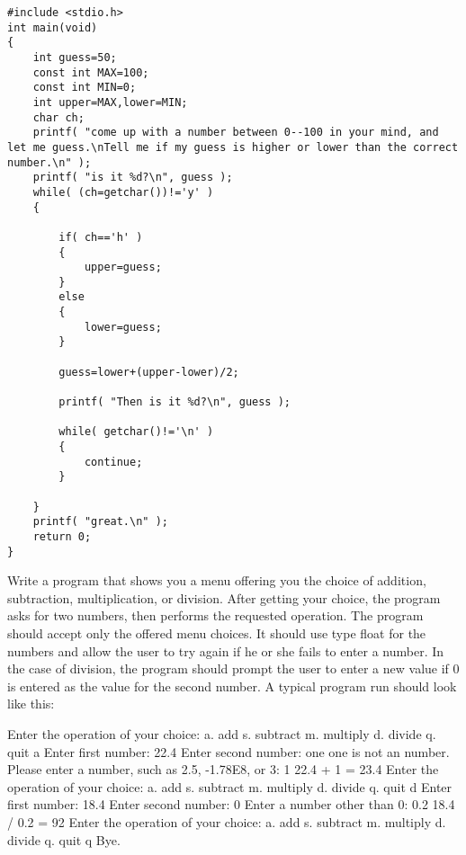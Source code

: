 \begin{solution}
  \begin{verbatim}
#include <stdio.h>
int main(void)
{
	int guess=50;
	const int MAX=100;
	const int MIN=0;
	int upper=MAX,lower=MIN;
	char ch;
	printf( "come up with a number between 0--100 in your mind, and let me guess.\nTell me if my guess is higher or lower than the correct number.\n" );
	printf( "is it %d?\n", guess );
	while( (ch=getchar())!='y' )
	{

		if( ch=='h' )
		{
			upper=guess;
		}
		else
		{
			lower=guess;
		}

		guess=lower+(upper-lower)/2;

		printf( "Then is it %d?\n", guess );

		while( getchar()!='\n' )
		{
			continue;
		}

	}
	printf( "great.\n" );
	return 0;
}
  \end{verbatim}
\end{solution}
\begin{question}
Write a program that shows you a menu offering you the choice of addition, subtraction,
multiplication, or division. After getting your choice, the program asks for two numbers,
then performs the requested operation. The program should accept only the offered
menu choices. It should use type float for the numbers and allow the user to try again
if he or she fails to enter a number. In the case of division, the program should prompt
the user to enter a new value if 0 is entered as the value for the second number. A typical
program run should look like this:
  
Enter the operation of your choice:
a. add
 s. subtract
m. multiply
 d. divide
q. quit
a
Enter first number: 22.4
Enter second number: one
one is not an number.
Please enter a number, such as 2.5, -1.78E8, or 3: 1
22.4 + 1 = 23.4
Enter the operation of your choice:
a. add
 s. subtract
m. multiply
 d. divide
q. quit
d
Enter first number: 18.4
Enter second number: 0
Enter a number other than 0: 0.2
18.4 / 0.2 = 92
Enter the operation of your choice:
a. add
 s. subtract
m. multiply
 d. divide
q. quit
q
Bye.
\end{question}
